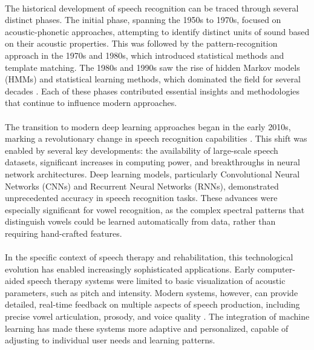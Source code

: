 \paragraph{}
The historical development of speech recognition can be traced through several distinct phases. The initial phase, spanning the 1950s to 1970s, focused on acoustic-phonetic approaches, attempting to identify distinct units of sound based on their acoustic properties. This was followed by the pattern-recognition approach in the 1970s and 1980s, which introduced statistical methods and template matching. The 1980s and 1990s saw the rise of hidden Markov models (HMMs) and statistical learning methods, which dominated the field for several decades \cite{formant_analysis2022}. Each of these phases contributed essential insights and methodologies that continue to influence modern approaches.

\paragraph{}
The transition to modern deep learning approaches began in the early 2010s, marking a revolutionary change in speech recognition capabilities \cite{cnn_vowels2023}. This shift was enabled by several key developments: the availability of large-scale speech datasets, significant increases in computing power, and breakthroughs in neural network architectures. Deep learning models, particularly Convolutional Neural Networks (CNNs) and Recurrent Neural Networks (RNNs), demonstrated unprecedented accuracy in speech recognition tasks. These advances were especially significant for vowel recognition, as the complex spectral patterns that distinguish vowels could be learned automatically from data, rather than requiring hand-crafted features.

\paragraph{}
In the specific context of speech therapy and rehabilitation, this technological evolution has enabled increasingly sophisticated applications. Early computer-aided speech therapy systems were limited to basic visualization of acoustic parameters, such as pitch and intensity. Modern systems, however, can provide detailed, real-time feedback on multiple aspects of speech production, including precise vowel articulation, prosody, and voice quality \cite{italian_therapy2023}. The integration of machine learning has made these systems more adaptive and personalized, capable of adjusting to individual user needs and learning patterns.

